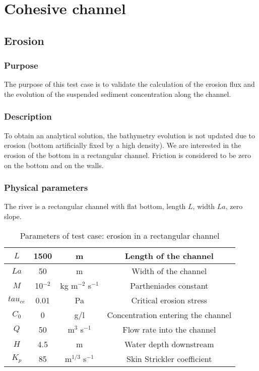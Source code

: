 \chapter{Cohesive channel}\label{cohesive channel}

\section{Erosion}

\subsection{Purpose}

The purpose of this test case is to validate the calculation of the
erosion flux and the evolution of the suspended sediment concentration
along the channel.

\subsection{Description}

To obtain an analytical solution, the bathymetry evolution
is not updated due to erosion (bottom artificially fixed
by a high density).
We are interested in the erosion of the
bottom in a rectangular channel. Friction is considered to be zero
on the bottom and on the walls.

\subsection{Physical parameters}

The river is a rectangular channel with flat bottom, length $L$, width
$La$, zero slope.

 \begin{table}[h!]
   \begin{center}
   \caption{Parameters of test case: erosion in a rectangular channel}
       \begin{tabular}{|c|c|c|c|}
       \hline
$L$ & 1500 & m & Length of the channel\\ \hline
$La$ & 50 & m & Width of the channel\\ \hline
$M$ & 10$^{-2}$ & kg m$^{-2}$ s$^{-1}$ & Partheniades constant\\ \hline
$tau_{ce}$ & 0.01 & Pa & Critical erosion stress\\ \hline
$C_0$ & 0 & g/l & Concentration entering the channel\\ \hline
$Q$ & 50 & m$^{3}$ s$^{-1}$ & Flow rate into the channel\\ \hline
$H$ & 4.5 & m & Water depth downstream\\ \hline
$K_p $ & 85 & m$^{1/3}$ s$^{-1}$ & Skin Strickler coefficient\\ \hline
        \end{tabular}
     \end{center}
\end{table}

